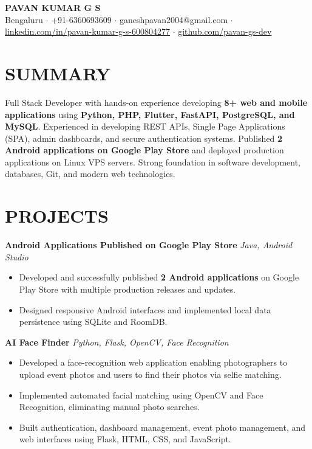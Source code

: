 \documentclass[10pt,a4paper]{article}
\begin{document}

\begin{center}
{\Huge \textbf{PAVAN KUMAR G S}}\\[2pt]

Bengaluru $\cdot$
+91-6360693609 $\cdot$
ganeshpavan2004@gmail.com $\cdot$
\href{https://linkedin.com/in/pavan-kumar-g-s-600804277}{linkedin.com/in/pavan-kumar-g-s-600804277}
$\cdot$
\href{https://github.com/pavan-gs-dev}{github.com/pavan-gs-dev}

\end{center}


\section*{SUMMARY}

Full Stack Developer with hands-on experience developing \textbf{8+ web and mobile applications} using \textbf{Python, PHP, Flutter, FastAPI, PostgreSQL, and MySQL}. Experienced in developing REST APIs, Single Page Applications (SPA), admin dashboards, and secure authentication systems. Published \textbf{2 Android applications on Google Play Store} and deployed production applications on Linux VPS servers. Strong foundation in software development, databases, Git, and modern web technologies.


\section*{PROJECTS}

\textbf{Android Applications Published on Google Play Store}
\hfill \textit{Java, Android Studio}

\begin{itemize}
\item Developed and successfully published \textbf{2 Android applications} on Google Play Store with multiple production releases and updates.
\item Designed responsive Android interfaces and implemented local data persistence using SQLite and RoomDB.
\end{itemize}

\textbf{AI Face Finder}
\hfill \textit{Python, Flask, OpenCV, Face Recognition}

\begin{itemize}
\item Developed a face-recognition web application enabling photographers to upload event photos and users to find their photos via selfie matching.
\item Implemented automated facial matching using OpenCV and Face Recognition, eliminating manual photo searches.
\item Built authentication, dashboard management, event photo management, and web interfaces using Flask, HTML, CSS, and JavaScript.
\end{itemize}
\end{document}
